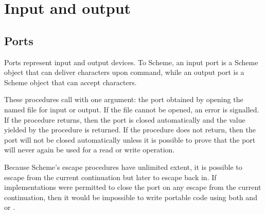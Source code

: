 \section{Input and output}

\subsection{Ports}
\label{portsection}

Ports represent input and output devices.  To Scheme, an input port is a
Scheme object that can deliver characters upon command, while an output port
is a Scheme object that can accept characters. 


\begin{entry}{%
}

 These procedures call  with one argument: the
port obtained by opening the named file for input or output.  If the
file cannot be opened, an error is signalled.  If the procedure returns,
then the port is closed automatically and the value yielded by the
procedure is returned.  If the procedure does not return, then 
the port will not be closed automatically unless it is possible to
prove that the port will never again be used for a read or write
operation.

\begin{rationale}
Because Scheme's escape procedures have unlimited extent, it  is
possible to escape from the current continuation but later to escape back in. 
If implementations were permitted to close the port on any escape from the
current continuation, then it would be impossible to write portable code using
both  and  or
.
\end{rationale} 
\end{entry}


